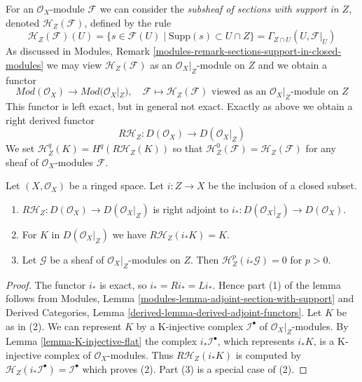 \medskip\noindent
For an $\mathcal{O}_X$-module $\mathcal{F}$ we can consider the
{\it subsheaf of sections with support in $Z$}, denoted
$\mathcal{H}_Z(\mathcal{F})$, defined by the rule
$$
\mathcal{H}_Z(\mathcal{F})(U) =
\{s \in \mathcal{F}(U) \mid \text{Supp}(s) \subset U \cap Z\} =
\Gamma_{Z \cap U}(U, \mathcal{F}|_U)
$$
As discussed in
Modules, Remark \ref{modules-remark-sections-support-in-closed-modules}
we may view $\mathcal{H}_Z(\mathcal{F})$ as an $\mathcal{O}_X|_Z$-module
on $Z$ and we obtain a functor
$$
\textit{Mod}(\mathcal{O}_X) \longrightarrow \textit{Mod}(\mathcal{O}_X|_Z),
\quad
\mathcal{F} \longmapsto \mathcal{H}_Z(\mathcal{F})
\text{ viewed as an }\mathcal{O}_X|_Z\text{-module on }Z
$$
This functor is left exact, but in general not exact. Exactly as above
we obtain a right derived functor
$$
R\mathcal{H}_Z : D(\mathcal{O}_X) \longrightarrow D(\mathcal{O}_X|_Z)
$$
We set $\mathcal{H}^q_Z(K) = H^q(R\mathcal{H}_Z(K))$ so that
$\mathcal{H}^0_Z(\mathcal{F}) = \mathcal{H}_Z(\mathcal{F})$
for any sheaf of $\mathcal{O}_X$-modules $\mathcal{F}$.

\begin{lemma}
\label{lemma-cohomology-with-support-sheaf-on-support}
Let $(X, \mathcal{O}_X)$ be a ringed space. Let $i : Z \to X$ be the
inclusion of a closed subset.
\begin{enumerate}
\item $R\mathcal{H}_Z : D(\mathcal{O}_X) \to D(\mathcal{O}_X|_Z)$
is right adjoint to $i_* : D(\mathcal{O}_X|_Z) \to D(\mathcal{O}_X)$.
\item For $K$ in $D(\mathcal{O}_X|_Z)$ we have $R\mathcal{H}_Z(i_*K) = K$.
\item Let $\mathcal{G}$ be a sheaf of
$\mathcal{O}_X|_Z$-modules on $Z$. Then
$\mathcal{H}^p_Z(i_*\mathcal{G}) = 0$ for $p > 0$.
\end{enumerate}
\end{lemma}

\begin{proof}
The functor $i_*$ is exact, so $i_* = Ri_* = Li_*$. Hence part (1)
of the lemma follows from
Modules, Lemma \ref{modules-lemma-adjoint-section-with-support}
and
Derived Categories, Lemma \ref{derived-lemma-derived-adjoint-functors}.
Let $K$ be as in (2). We can represent $K$ by a K-injective complex
$\mathcal{I}^\bullet$ of $\mathcal{O}_X|_Z$-modules. By
Lemma \ref{lemma-K-injective-flat}
the complex $i_*\mathcal{I}^\bullet$, which represents $i_*K$,
is a K-injective complex of $\mathcal{O}_X$-modules. Thus
$R\mathcal{H}_Z(i_*K)$ is computed by
$\mathcal{H}_Z(i_*\mathcal{I}^\bullet) = \mathcal{I}^\bullet$
which proves (2). Part (3) is a special case of (2).
\end{proof}

